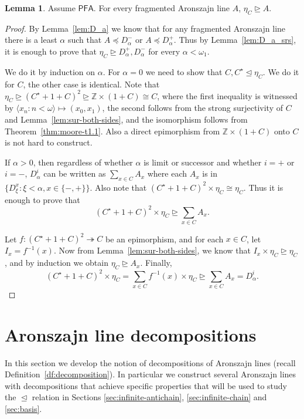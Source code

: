 \documentclass[10pt]{amsart}
\theoremstyle{definition}
\newtheorem{lemma}[theorem]{Lemma}
\theoremstyle{remark}
\newcommand{\tup}[1]{\langle#1\rangle}
\newcommand{\axiom}[1]{\mathsf{#1}}
\newcommand{\PFA}{\axiom{PFA}}
\newcommand{\eleq}{\preceq}
\newcommand{\sleq}{\trianglelefteq}
\newcommand{\sgeq}{\trianglerighteq}
\newcommand{\sur}{\twoheadrightarrow}
\newcommand{\1}{\mathbbm{1}}
\begin{document}
\begin{lemma}\label{lem:sur_frag}
  Assume $\PFA$. For every fragmented Aronszajn line $A$, $\eta_{C} \sgeq A$.
\end{lemma}
\begin{proof}
  By Lemma~\ref{lem:D_a} we know that for any fragmented Aronszajn line
  there is a least $\alpha$ such that $A \eleq D_{\alpha}^{-}$
  or $A \eleq D_{\alpha}^{+}$. Thus by Lemma~\ref{lem:D_a_srs}, it is enough
  to prove that $\eta_{C} \sgeq D_{\alpha}^{+},D_{\alpha}^{-}$ for every
  $\alpha < \omega_{1}$.

  We do it by induction on $\alpha$.
  For $\alpha = 0$ we need to show that $C,C^{\star} \sleq
  \eta_{C}$. We do it for $C$, the other case is identical.
  Note that $\eta_{C} \sgeq {(C^{\star} + 1 + C)}^{2}
  \sgeq \mathbb{Z} \times (1+C) \cong C$, where the first inequality is
  witnessed by $\tup{x_{n} : n < \omega} \mapsto (x_{0},x_{1})$, the
  second follows from the strong surjectivity of $C$ and Lemma~\ref{lem:sur-both-sides},
  and the isomorphism follows from Theorem~\ref{thm:moore-t1.1}. Also a direct epimorphism
  from $\mathbb{Z} \times (1+C)$ onto $C$ is not hard to construct.

  If $\alpha > 0$, then
  regardless of whether $\alpha$ is limit or successor and
  whether $i = +$ or $i = -$,
  $D_{\alpha}^{i}$ can be written as $\sum_{x \in C}A_{x}$ where each
  $A_{x}$ is in $\{D_{\xi}^{x} : \xi < \alpha, x \in \{-,+\}\}$.
  Also note that
  ${(C^{\star} + 1 + C)}^{2} \times \eta_{C} \cong \eta_{C}$. Thus
  it is enough to prove that
  \[{(C^{\star} + 1 + C)}^{2} \times \eta_{C} \sgeq \sum_{x \in C}A_{x}.\]

  Let $f : {(C^{\star} + 1 + C)}^{2} \sur C$ be an epimorphism,
  and for each $x \in C$, let $I_{x} = f^{-1}(x)$. Now from
 Lemma~\ref{lem:sur-both-sides}, we know that
  $I_{x} \times \eta_{C} \sgeq \eta_{C}$, and by induction we obtain
  $\eta_{C} \sgeq A_{x}$. Finally,
  \[{(C^{\star} + 1 + C)}^{2} \times \eta_{C}
    = \sum_{x \in C}f^{-1}(x)\times\eta_{C} \sgeq \sum_{x \in C}A_{x} = D_{\alpha}^{i}.\]
\end{proof}


\section{Aronszajn line decompositions}\label{sec:decompositions}

In this section we develop the notion of decompositions of Aronszajn lines (recall Definition~\ref{df:decomposition}). In particular
we construct several Aronszajn lines with decompositions that achieve
specific properties that will be used to study the $\sleq$ relation
in Sections \ref{sec:infinite-antichain}, \ref{sec:infinite-chain} and \ref{sec:basis}.
\end{document}
